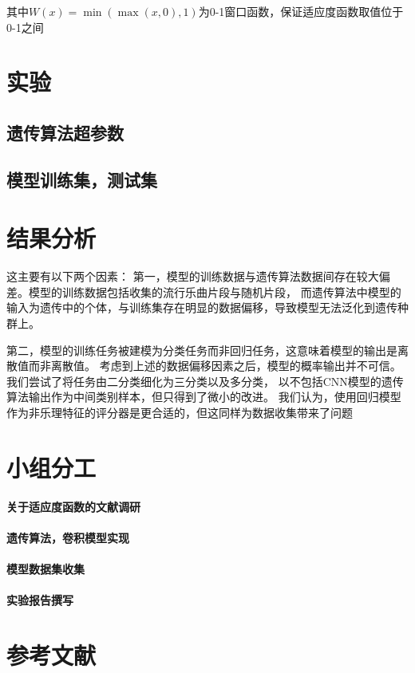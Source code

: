 \documentclass{article}
\begin{document}
其中$W(x) = \min(\max(x, 0), 1)$为0-1窗口函数，保证适应度函数取值位于0-1之间








\newpage

\section{实验}
\subsection{遗传算法超参数}
\subsection{模型训练集，测试集}
\newpage
\section{结果分析}
这主要有以下两个因素：
第一，模型的训练数据与遗传算法数据间存在较大偏差。模型的训练数据包括收集的流行乐曲片段与随机片段，
而遗传算法中模型的输入为遗传中的个体，与训练集存在明显的数据偏移，导致模型无法泛化到遗传种群上。

第二，模型的训练任务被建模为分类任务而非回归任务，这意味着模型的输出是离散值而非离散值。
考虑到上述的数据偏移因素之后，模型的概率输出并不可信。我们尝试了将任务由二分类细化为三分类以及多分类，
以不包括CNN模型的遗传算法输出作为中间类别样本，但只得到了微小的改进。
我们认为，使用回归模型作为非乐理特征的评分器是更合适的，但这同样为数据收集带来了问题
\newpage
\section{小组分工}
\paragraph{关于适应度函数的文献调研}

\paragraph{遗传算法，卷积模型实现}

\paragraph{模型数据集收集}

\paragraph{实验报告撰写}



\section{参考文献}
\end{document}
